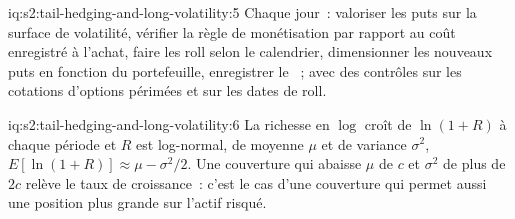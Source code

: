 \begin{solution}{iq:s2:tail-hedging-and-long-volatility:5}
Chaque jour~: valoriser les puts sur la surface de volatilité, vérifier la règle de monétisation par rapport au coût enregistré à l'achat, faire les roll selon le calendrier, dimensionner les nouveaux puts en fonction du
portefeuille, enregistrer le ~; avec des contrôles sur les cotations d'options périmées et sur les dates de roll.
\end{solution}

\begin{solution}{iq:s2:tail-hedging-and-long-volatility:6}
La richesse en $\log$ croît de $\ln(1 + R)$ à chaque période et $R$ est log-normal, de moyenne $\mu$ et de variance $\sigma^2$, $E[\ln(1 + R)] \approx \mu -
\sigma^2/2$. Une couverture qui abaisse $\mu$ de $c$ et $\sigma^2$ de plus de $2c$ relève le taux de croissance~: c'est le cas d'une couverture qui permet aussi une
position plus grande sur l'actif risqué.
\end{solution}
